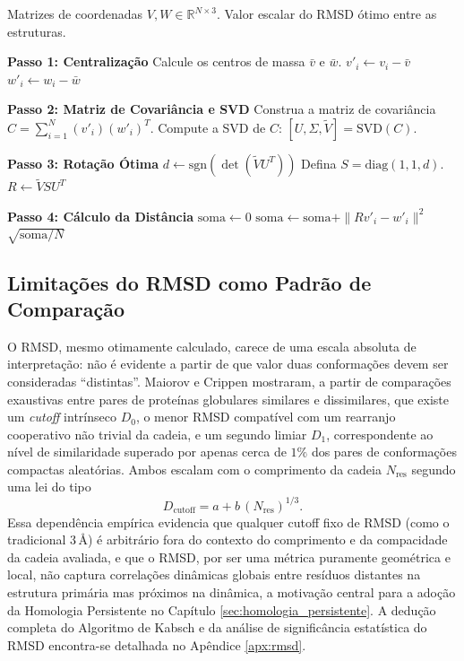 \documentclass[12pt, a4paper]{article}
\theoremstyle{plain}
\theoremstyle{definition}
\theoremstyle{remark}
\newcommand{\ident}{\hspace{2em}}
\begin{document}
\begin{algorithm}[H]
\caption{Cálculo do RMSD Ótimo (Algoritmo de Kabsch)}
\label{alg:rmsd}
\linespread{1.3}\selectfont
\begin{algorithmic}[1]
\Require Matrizes de coordenadas $V, W \in \mathbb{R}^{N \times 3}$.
\Ensure Valor escalar do RMSD ótimo entre as estruturas.

\Statex \textbf{Passo 1: Centralização}
\State Calcule os centros de massa $\bar{v}$ e $\bar{w}$.
    \State $v'_i \leftarrow v_i - \bar{v}$
    \State $w'_i \leftarrow w_i - \bar{w}$
\EndFor

\Statex \textbf{Passo 2: Matriz de Covariância e SVD}
\State Construa a matriz de covariância $C = \sum_{i=1}^N (v'_i)(w'_i)^T$.
\State Compute a SVD de $C$: $[U, \Sigma, \tilde{V}] = \text{SVD}(C)$.

\Statex \textbf{Passo 3: Rotação Ótima}
\State $d \leftarrow \text{sgn}(\det(\tilde{V} U^T))$
\State Defina $S = \text{diag}(1, 1, d)$.
\State $R \leftarrow \tilde{V} S U^T$

\Statex \textbf{Passo 4: Cálculo da Distância}
\State $\text{soma} \leftarrow 0$
    \State $\text{soma} \leftarrow \text{soma} + \|R v'_i - w'_i\|^2$
\EndFor
\State \Return $\sqrt{\text{soma} / N}$
\end{algorithmic}
\end{algorithm}

\subsection{Limitações do RMSD como Padrão de Comparação}

\ident O RMSD, mesmo otimamente calculado, carece de uma escala absoluta de
interpretação: não é evidente a partir de que valor duas conformações devem
ser consideradas ``distintas''. Maiorov e Crippen \cite{maiorov1994}
mostraram, a partir de comparações exaustivas entre pares de proteínas
globulares similares e dissimilares, que existe um \emph{cutoff} intrínseco
$D_0$, o menor RMSD compatível com um rearranjo cooperativo não trivial da
cadeia, e um segundo limiar $D_1$, correspondente ao nível de
similaridade superado por apenas cerca de $1\%$ dos pares de conformações
compactas aleatórias. Ambos escalam com o comprimento da cadeia $N_{\mathrm{res}}$
segundo uma lei do tipo
\begin{equation*}
    D_{\text{cutoff}} = a + b\,(N_{\mathrm{res}})^{1/3}.
\end{equation*}
\ident Essa dependência empírica evidencia que qualquer cutoff fixo de RMSD (como o
tradicional $3\,\text{\AA}$) é arbitrário fora do contexto do comprimento e
da compacidade da cadeia avaliada, e que o RMSD, por ser uma métrica
puramente geométrica e local, não captura correlações dinâmicas globais entre
resíduos distantes na estrutura primária mas próximos na dinâmica, a
motivação central para a adoção da Homologia Persistente no Capítulo \ref{sec:homologia_persistente}. A
dedução completa do Algoritmo de Kabsch e da análise de significância
estatística do RMSD encontra-se detalhada no Apêndice \ref{apx:rmsd}.
\end{document}
